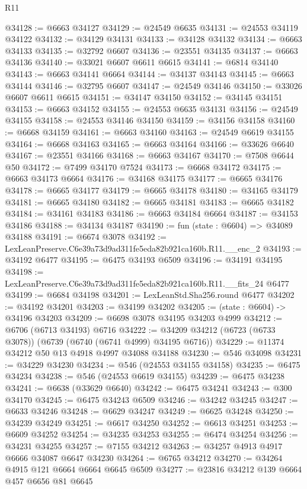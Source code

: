\begin{lexlean}{R11}
\begin{coremodule}
@34128 := @6663 @34127
@34129 := @24549 @6635
@34131 := @24553 @34119 @34122
@34132 := @34129 @34131
@34133 := @34128 @34132
@34134 := @6663 @34133
@34135 := @32792 @6607
@34136 := @23551 @34135
@34137 := @6663 @34136
@34140 := @33021 @6607 @6611 @6615
@34141 := @6814 @34140
@34143 := @6663 @34141 @6664
@34144 := @34137 @34143
@34145 := @6663 @34144
@34146 := @32795 @6607
@34147 := @24549 @34146
@34150 := @33026 @6607 @6611 @6615
@34151 := @34147 @34150
@34152 := @34145 @34151
@34153 := @6663 @34152
@34155 := @24553 @6635 @34131
@34156 := @24549 @34155
@34158 := @24553 @34146 @34150
@34159 := @34156 @34158
@34160 := @6668 @34159
@34161 := @6663 @34160
@34163 := @24549 @6619 @34155
@34164 := @6668 @34163
@34165 := @6663 @34164
@34166 := @33626 @6640
@34167 := @23551 @34166
@34168 := @6663 @34167
@34170 := @7508 @6644 @50
@34172 := @7499 @34170 @7524
@34173 := @6668 @34172
@34175 := @6663 @34173 @6664
@34176 := @34168 @34175
@34177 := @6665 @34176
@34178 := @6665 @34177
@34179 := @6665 @34178
@34180 := @34165 @34179
@34181 := @6665 @34180
@34182 := @6665 @34181
@34183 := @6665 @34182
@34184 := @34161 @34183
@34186 := @6663 @34184 @6664
@34187 := @34153 @34186
@34188 := @34134 @34187
@34190 := fun (state : @6604) => @34089 @34188
@34191 := @6674 @3078
@34192 := LexLeanPreserve.C6e39a73d9ad311fe5eda82b921ca160b.R11.__enc_2
@34193 := @34192 @6477
@34195 := @6475 @34193 @6509
@34196 := @34191 @34195
@34198 := LexLeanPreserve.C6e39a73d9ad311fe5eda82b921ca160b.R11.__fits_24 @6477
@34199 := @6684 @34198
@34201 := LexLeanStd.Sha256.round @6477
@34202 := @34192 @34201
@34203 := @34199 @34202
@34205 := (state : @6604) -> @34196 @34203
@34209 := @6698 @3078 @34195 @34203 @4999
@34212 := @6706 (@6713 @34193) @6716
@34222 := @34209 @34212 (@6723 (@6733 @3078)) (@6739 (@6740 (@6741 @4999) @34195 @6716))
@34229 := @11374 @34212 @50 @13 @4918 @4997 @34088 @34188
@34230 := @546 @34098
@34231 := @34229 @34230
@34234 := @546 (@24553 @34155 @34158)
@34235 := @6475 @34234
@34238 := @546 (@24553 @6619 @34155)
@34239 := @6475 @34238
@34241 := @6638 (@33629 @6640)
@34242 := @6475 @34241
@34243 := @300 @34170
@34245 := @6475 @34243 @6509
@34246 := @34242 @34245
@34247 := @6633 @34246
@34248 := @6629 @34247
@34249 := @6625 @34248
@34250 := @34239 @34249
@34251 := @6617 @34250
@34252 := @6613 @34251
@34253 := @6609 @34252
@34254 := @34235 @34253
@34255 := @6474 @34254
@34256 := @34231 @34255
@34257 := @7155 @34212
@34263 := @34257 @4913 @4917 @6666 @34087 @6647 @34230
@34264 := @6765 @34212
@34270 := @34264 @4915 @121 @6664 @6664 @6645 @6509
@34277 := @23816 @34212 @139 @6664 @457 @6656 @81 @6645

\end{coremodule}
\end{lexlean}
